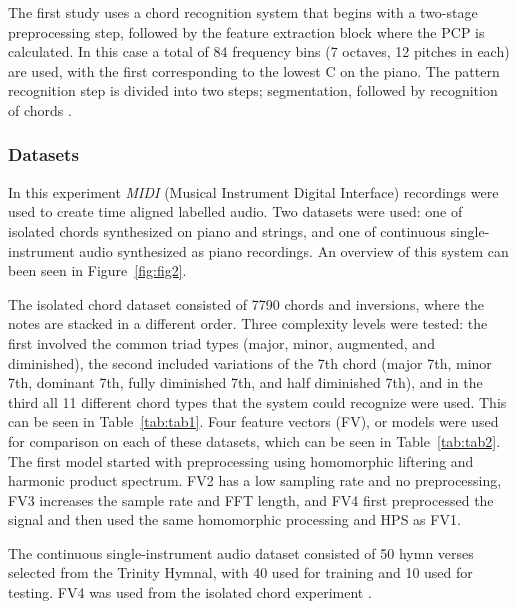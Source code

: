 \documentclass{sig-alternate}
\begin{document}
The first study \cite{Morman:2006} uses a chord recognition system that begins with a two-stage preprocessing step, followed by the feature extraction block where the PCP is calculated. In this case a total of 84 frequency bins (7 octaves, 12 pitches in each) are used, with the first corresponding to the lowest C on the piano. The pattern recognition step is divided into two steps; segmentation, followed by recognition of chords \cite{Morman:2006}.


\subsubsection{Datasets}

In this experiment \textit{MIDI} (Musical Instrument Digital Interface) recordings were used to create time aligned labelled audio. Two datasets were used: one of isolated chords synthesized on piano and strings, and one of continuous single-instrument audio synthesized as piano recordings. An overview of this system can been seen in Figure~\ref{fig:fig2}.

The isolated chord dataset consisted of 7790 chords and inversions, where the notes are stacked in a different order. Three complexity levels were tested: the first involved the common triad types (major, minor, augmented, and diminished), the second included variations of the 7th chord (major 7th, minor 7th, dominant 7th, fully diminished 7th, and half diminished 7th), and in the third all 11 different chord types that the system could recognize were used. This can be seen in Table~\ref{tab:tab1}. Four feature vectors (FV), or models were used for comparison on each of these datasets, which can be seen in Table~\ref{tab:tab2}. The first model started with preprocessing using homomorphic liftering and harmonic product spectrum. FV2 has a low sampling rate and no preprocessing, FV3 increases the sample rate and FFT length, and FV4 first preprocessed the signal and then used the same homomorphic processing and HPS as FV1.


The continuous single-instrument audio dataset consisted of 50 hymn verses selected from the Trinity Hymnal, with 40 used for training and 10 used for testing. FV4 was used from the isolated chord experiment \cite{Morman:2006}. 
\end{document}

